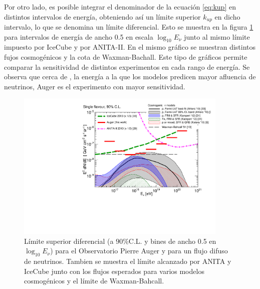 	Por otro lado, es posible integrar el denominador de la ecuaci\'on \ref{eq:kup} en distintos intervalos de energ\'ia, obteniendo as\'i un l\'imite superior $k_{up}$ en dicho intervalo, lo que se denomina un l\'imite diferencial.
	Esto se muestra en la figura \ref{fig:difLimits} para intervalos de energ\'ia de ancho 0.5 en escala $\log_{10}E_\nu$ junto al mismo l\'imite impuesto por IceCube y por ANITA-II.
	En el mismo gr\'afico se muestran distintos fujos cosmog\'enicos y la cota de Waxman-Bachall.
	Este tipo de gr\'aficos permite comparar la sensitividad de distintos experimentos en cada rango de energ\'ia.
	Se observa que cerca de , la energ\'ia a la que los modelos predicen mayor afluencia de neutrinos, Auger es el experimento con mayor sensitividad.
	\begin{figure}[ht!]
		\begin{center}
			\includegraphics[width=0.9\textwidth]{fig/resultadosAuger/diff_limits_and_models_paper_combined_all}
			\caption{\label{fig:difLimits}
			L\'imite superior diferencial (a $90\%$C.L. y bines de ancho 0.5 en $\log_{10}E_\nu$) para el Observatorio Pierre Auger y para un flujo difuso de neutrinos.
			Tambien se muestra el l\'imite alcanzado por ANITA\cite{XXX} y IceCube\cite{XXX2} junto con los flujos esperados para varios modelos cosmog\'enicos\cite{XXX} y el l\'imite de Waxman-Bahcall\cite{XXX2}.
			}
		\end{center}
	\end{figure}
	
